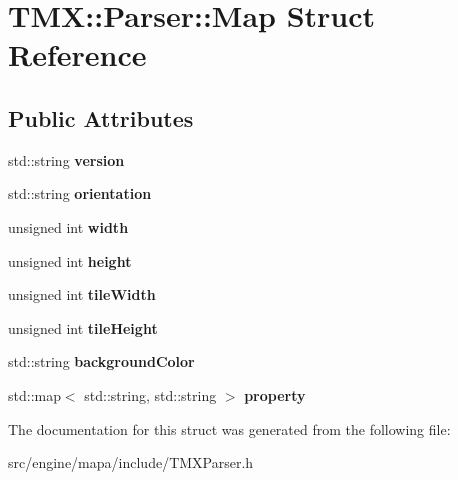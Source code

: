 \hypertarget{struct_t_m_x_1_1_parser_1_1_map}{}\section{T\+MX\+:\+:Parser\+:\+:Map Struct Reference}
\label{struct_t_m_x_1_1_parser_1_1_map}
\subsection*{Public Attributes}
\begin{DoxyCompactItemize}
\item 
std\+::string {\bfseries version}\hypertarget{struct_t_m_x_1_1_parser_1_1_map_ab457e6705cc3f3a39147a539307b635f}{}\label{struct_t_m_x_1_1_parser_1_1_map_ab457e6705cc3f3a39147a539307b635f}

\item 
std\+::string {\bfseries orientation}\hypertarget{struct_t_m_x_1_1_parser_1_1_map_a945dfd673bafc7f96aa1474e18963cb6}{}\label{struct_t_m_x_1_1_parser_1_1_map_a945dfd673bafc7f96aa1474e18963cb6}

\item 
unsigned int {\bfseries width}\hypertarget{struct_t_m_x_1_1_parser_1_1_map_a4338d3f05dc42b14f603aa8ce1413d67}{}\label{struct_t_m_x_1_1_parser_1_1_map_a4338d3f05dc42b14f603aa8ce1413d67}

\item 
unsigned int {\bfseries height}\hypertarget{struct_t_m_x_1_1_parser_1_1_map_abf57bc2c65496718c6bdea647e0d0ec1}{}\label{struct_t_m_x_1_1_parser_1_1_map_abf57bc2c65496718c6bdea647e0d0ec1}

\item 
unsigned int {\bfseries tile\+Width}\hypertarget{struct_t_m_x_1_1_parser_1_1_map_adf712cbd57543e77156de25cbfc6145b}{}\label{struct_t_m_x_1_1_parser_1_1_map_adf712cbd57543e77156de25cbfc6145b}

\item 
unsigned int {\bfseries tile\+Height}\hypertarget{struct_t_m_x_1_1_parser_1_1_map_a8171070658368818d4d4a4f1ba48a065}{}\label{struct_t_m_x_1_1_parser_1_1_map_a8171070658368818d4d4a4f1ba48a065}

\item 
std\+::string {\bfseries background\+Color}\hypertarget{struct_t_m_x_1_1_parser_1_1_map_ac719e47959e1b66d9689bfbc0b91dccd}{}\label{struct_t_m_x_1_1_parser_1_1_map_ac719e47959e1b66d9689bfbc0b91dccd}

\item 
std\+::map$<$ std\+::string, std\+::string $>$ {\bfseries property}\hypertarget{struct_t_m_x_1_1_parser_1_1_map_aca5abf5c028b13b3105ee2622b67a29f}{}\label{struct_t_m_x_1_1_parser_1_1_map_aca5abf5c028b13b3105ee2622b67a29f}

\end{DoxyCompactItemize}


The documentation for this struct was generated from the following file\+:\begin{DoxyCompactItemize}
\item 
src/engine/mapa/include/T\+M\+X\+Parser.\+h\end{DoxyCompactItemize}
